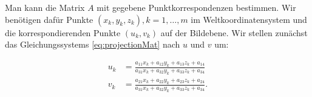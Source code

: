 %

 
Man kann die Matrix $A$ mit gegebene Punktkorrespondenzen bestimmen. Wir benötigen dafür Punkte $(x_k,y_k, z_k), k = 1,\dotsc,m$ im Weltkoordinatensystem und die korrespondierenden Punkte $(u_k, v_k)$ auf der Bildebene.
Wir stellen zunächst das Gleichungssystems \ref{eq:projectionMat} nach $u$ und $v$ um:
 
 \begin{equation*}
 \begin{aligned}
 u_k &= \frac{a_{11} x_k +a_{12}y_k + a_{13}z_k + a_{14}}{a_{31} x_k +a_{32}y_k + a_{33}z_k + a_{34}} \\
 v_k &= \frac{a_{21} x_k +a_{22}y_k + a_{23}z_k + a_{24}}{a_{31} x_k +a_{32}y_k + a_{33}z_k + a_{34}}.
 \end{aligned}
 \end{equation*}
 
